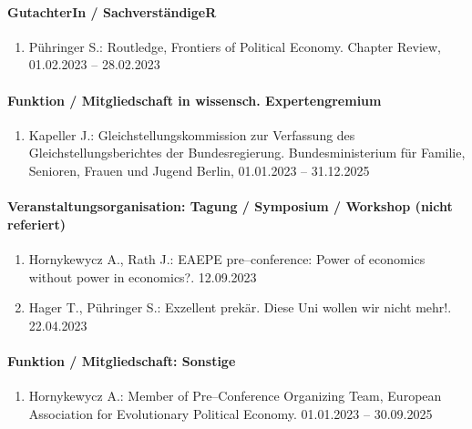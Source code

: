 \paragraph{GutachterIn / SachverständigeR}
\begin{enumerate}[leftmargin=*, labelsep=0.5cm]
\item Pühringer S.: Routledge, Frontiers of Political Economy. Chapter Review, 01.02.2023 -- 28.02.2023
\end{enumerate}
\paragraph{Funktion / Mitgliedschaft in wissensch. Expertengremium}
\begin{enumerate}[leftmargin=*, labelsep=0.5cm]
\item Kapeller J.: Gleichstellungskommission zur Verfassung des Gleichstellungsberichtes der Bundesregierung. Bundesministerium für Familie, Senioren, Frauen und Jugend Berlin, 01.01.2023 -- 31.12.2025
\end{enumerate}
\paragraph{Veranstaltungsorganisation: Tagung / Symposium / Workshop (nicht referiert)}
\begin{enumerate}[leftmargin=*, labelsep=0.5cm]
\item Hornykewycz A., Rath J.: EAEPE pre--conference: Power of economics without power in economics?. 12.09.2023
\item Hager T., Pühringer S.: Exzellent prekär. Diese Uni wollen wir nicht mehr!. 22.04.2023
\end{enumerate}
\paragraph{Funktion / Mitgliedschaft: Sonstige}
\begin{enumerate}[leftmargin=*, labelsep=0.5cm]
\item Hornykewycz A.: Member of Pre--Conference Organizing Team, European Association for Evolutionary Political Economy. 01.01.2023 -- 30.09.2025
\end{enumerate}
